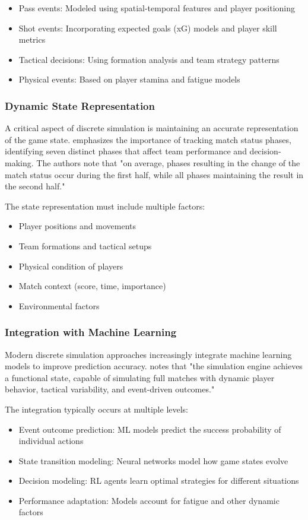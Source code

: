 \documentclass[10pt,journal,compsoc]{IEEEtran}
\begin{document}
\begin{itemize}
    \item Pass events: Modeled using spatial-temporal features and player positioning
    \item Shot events: Incorporating expected goals (xG) models and player skill metrics
    \item Tactical decisions: Using formation analysis and team strategy patterns
    \item Physical events: Based on player stamina and fatigue models
\end{itemize}

\subsubsection{Dynamic State Representation}
A critical aspect of discrete simulation is maintaining an accurate representation of the game state. \cite{konefal2023seven} emphasizes the importance of tracking match status phases, identifying seven distinct phases that affect team performance and decision-making. The authors note that "on average, phases resulting in the change of the match status occur during the first half, while all phases maintaining the result in the second half."

The state representation must include multiple factors:
\begin{itemize}
    \item Player positions and movements
    \item Team formations and tactical setups
    \item Physical condition of players
    \item Match context (score, time, importance)
    \item Environmental factors
\end{itemize}

\subsubsection{Integration with Machine Learning}
Modern discrete simulation approaches increasingly integrate machine learning models to improve prediction accuracy. \cite{pu2024orientation} notes that "the simulation engine achieves a functional state, capable of simulating full matches with dynamic player behavior, tactical variability, and event-driven outcomes."

The integration typically occurs at multiple levels:
\begin{itemize}
    \item Event outcome prediction: ML models predict the success probability of individual actions
    \item State transition modeling: Neural networks model how game states evolve
    \item Decision modeling: RL agents learn optimal strategies for different situations
    \item Performance adaptation: Models account for fatigue and other dynamic factors
\end{itemize}
\end{document}
